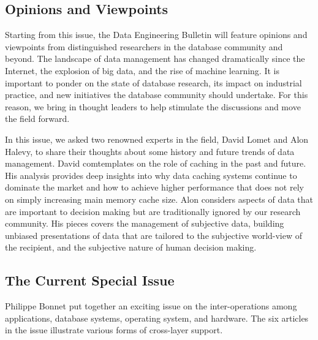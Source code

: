 \documentclass[11pt]{article}
\begin{document}
\subsection*{Opinions and Viewpoints}

Starting from this issue, the Data Engineering Bulletin will feature
opinions and viewpoints from distinguished researchers in the database
community and beyond. The landscape of data management has changed
dramatically since the Internet, the explosion of big data, and the
rise of machine learning. It is important to ponder on the state of
database research, its impact on industrial practice, and new
initiatives the database community should undertake. For this reason,
we bring in thought leaders to help stimulate the discussions and move
the field forward.

In this issue, we asked two renowned experts in the field, David Lomet
and Alon Halevy, to share their thoughts about some history and future
trends of data management. David comtemplates on the role of caching
in the past and future. His analysis provides deep insights into why
data caching systems continue to dominate the market and how to
achieve higher performance that does not rely on simply increasing
main memory cache size. Alon considers aspects of data that are
important to decision making but are traditionally ignored by our
research community. His pieces covers the management of subjective
data, building unbiased presentations of data that are tailored to the
subjective world-view of the recipient, and the subjective nature of
human decision making.

\subsection*{The Current Special Issue}
Philippe Bonnet put together an exciting issue on the inter-operations
among applications, database systems, operating system, and
hardware. The six articles in the issue illustrate various forms of
cross-layer support.
\end{document}
